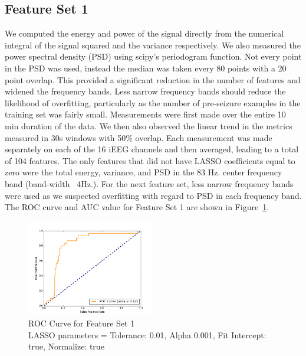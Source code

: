 \documentclass[10pt, conference, compsocconf]{IEEEtran}
\begin{document}
\subsection{Feature Set 1}
We computed the energy and power of the signal directly from the numerical
integral of the signal squared and the variance respectively. We also measured
the power spectral density (PSD) using scipy’s periodogram function. Not every
point in the PSD was used, instead the median was taken every 80 points with a
20 point overlap. This provided a significant reduction in the number of
features and widened the frequency bands. Less narrow frequency bands should
reduce the likelihood of overfitting, particularly as the number of pre-seizure
examples in the training set was fairly small. Measurements were first made over
the entire 10 min duration of the data. We then also observed the linear trend
in the metrics measured in 30s windows with 50\% overlap. Each measurement was
made separately on each of the 16 iEEG channels and then averaged, leading to a
total of 104 features. The only features that did not have LASSO coefficients
equal to zero were the total energy, variance, and PSD in the 83 Hz. center
frequency band (band-width ~4Hz.). For the next feature set, less narrow
frequency bands were used as we suspected overfitting with regard to PSD in each
frequency band. The ROC curve and AUC value for Feature Set 1 are shown in
Figure~\ref{fig:ROC1}.

\begin{figure}[t]
\centering
  \includegraphics[width=0.5\textwidth]{fig/image02.png}  
    \caption{ROC Curve for Feature Set 1\\LASSO parameters = Tolerance: 0.01, Alpha 0.001, Fit Intercept:
    true, Normalize: true}
   \label{fig:ROC1}
\end{figure}
\end{document}
